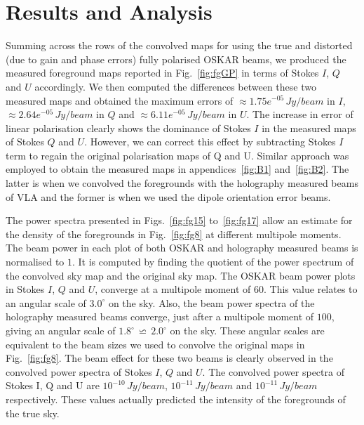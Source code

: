 \documentclass[fleqn,usenatbib]{mnras}
\begin{document}
\section{Results and Analysis}    \label{sec:results}
Summing across the rows of the convolved maps for using the true and distorted (due to gain and phase errors) fully polarised OSKAR beams, we produced the measured foreground maps reported in Fig.~\ref{fig:fgGP} in terms of Stokes $I$, $Q$ and $U$ accordingly. We then computed the differences between these two measured maps and obtained the maximum errors of $\approx 1.75e^{-05} \, Jy/beam$ in $I$, $\approx 2.64e^{-05} \, Jy/beam$ in $Q$ and $\approx 6.11e^{-05} \, Jy/beam$ in $U$.  The increase in error of linear polarisation clearly shows the dominance of Stokes $I$ in the measured maps of Stokes $Q$ and $U$. However, we can correct this effect by subtracting Stokes $I$ term to regain the original polarisation maps of Q and U. Similar approach was employed to obtain the measured maps in appendices~\ref{fig:B1} and~\ref{fig:B2}. The latter is when we convolved the foregrounds with the holography measured beams of VLA and the former is when we used the dipole orientation error beams.

The power spectra presented in Figs.~\ref{fig:fg15} to~\ref{fig:fg17} allow an estimate for the density of the foregrounds in Fig.~\ref{fig:fg8} at different multipole moments. The beam power in each plot of both OSKAR and holography measured beams is normalised to $1$. It is computed by finding the quotient of the power spectrum of the convolved sky map and the original sky map. The OSKAR beam power plots in Stokes $I$, $Q$ and $U$, converge at a multipole moment of $60$. This value relates to an angular scale of $3.0^\circ$ on the sky. Also, the beam power spectra of the holography measured beams converge, just after a multipole moment of $100$, giving an angular scale of $1.8^\circ \, \backsimeq \, 2.0^\circ$ on the sky. These angular scales are equivalent to the beam sizes we used to convolve the original maps in Fig.~\ref{fig:fg8}. The beam effect for these two beams is clearly observed in the convolved power spectra of Stokes $I$, $Q$ and $U$. The convolved power spectra of Stokes I, Q and U are $10^{-10} \, Jy/beam $, $10^{-11} \, Jy/beam $  and $10^{-11} \, Jy/beam $ respectively. These values actually predicted the intensity of the foregrounds of the true sky.
\end{document}
